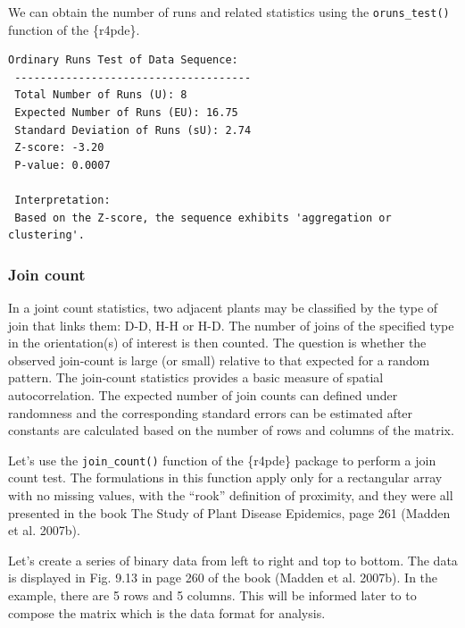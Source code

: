 \documentclass[
  letterpaper,
]{book}
\newenvironment{Shaded}{\begin{snugshade}}{\end{snugshade}}
\newcommand{\FunctionTok}[1]{\textcolor[rgb]{0.28,0.35,0.67}{#1}}
\newcommand{\NormalTok}[1]{\textcolor[rgb]{0.00,0.23,0.31}{#1}}
\newcommand{\SpecialCharTok}[1]{\textcolor[rgb]{0.37,0.37,0.37}{#1}}
\begin{document}
We can obtain the number of runs and related statistics using the
\texttt{oruns\_test()} function of the \{r4pde\}.

\begin{Shaded}
\end{Shaded}

\begin{verbatim}
Ordinary Runs Test of Data Sequence:
 -------------------------------------
 Total Number of Runs (U): 8
 Expected Number of Runs (EU): 16.75
 Standard Deviation of Runs (sU): 2.74
 Z-score: -3.20
 P-value: 0.0007

 Interpretation:
 Based on the Z-score, the sequence exhibits 'aggregation or clustering'.
\end{verbatim}

\hypertarget{join-count}{%
\subsubsection{Join count}\label{join-count}}

In a joint count statistics, two adjacent plants may be classified by
the type of join that links them: D-D, H-H or H-D. The number of joins
of the specified type in the orientation(s) of interest is then counted.
The question is whether the observed join-count is large (or small)
relative to that expected for a random pattern. The join-count
statistics provides a basic measure of spatial autocorrelation. The
expected number of join counts can defined under randomness and the
corresponding standard errors can be estimated after constants are
calculated based on the number of rows and columns of the matrix.

Let's use the \texttt{join\_count()} function of the \{r4pde\} package
to perform a join count test. The formulations in this function apply
only for a rectangular array with no missing values, with the ``rook''
definition of proximity, and they were all presented in the book The
Study of Plant Disease Epidemics, page 261 (Madden et al. 2007b).

Let's create a series of binary data from left to right and top to
bottom. The data is displayed in Fig. 9.13 in page 260 of the book
(Madden et al. 2007b). In the example, there are 5 rows and 5 columns.
This will be informed later to to compose the matrix which is the data
format for analysis.
\end{document}
